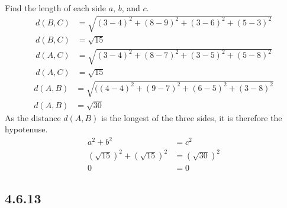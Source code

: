 \documentclass{article}
\begin{document}
Find the length of each side $ a $, $ b $, and $ c $.
\begin{align*}
	d(B, C) & = \sqrt{ (3 - 4)^2 + (8 - 9)^2 + (3 - 6)^2 + (5 - 3)^2 } \\
	d(B, C) & = \sqrt{15}
\end{align*}
\begin{align*}
	d(A, C) & = \sqrt{ (3 - 4)^2 + (8 - 7)^2 + (3 - 5)^2 + (5 - 8)^2 } \\
	d(A, C) & = \sqrt{15}
\end{align*}
\begin{align*}
	d(A, B) & = \sqrt{ ((4 - 4)^2 + (9 - 7)^2 + (6 - 5)^2 + (3 - 8)^2 } \\
	d(A, B) & = \sqrt{30}
\end{align*}
As the distance $ d(A, B) $ is the longest of the three sides, it is therefore the hypotenuse.
\begin{align*}
	a^2 + b^2 & = c^2 \\
	(\sqrt{15})^2 + (\sqrt{15})^2 & = (\sqrt{30})^2 \\
	0 & = 0
\end{align*}

\subsection{4.6.13}
\end{document}
